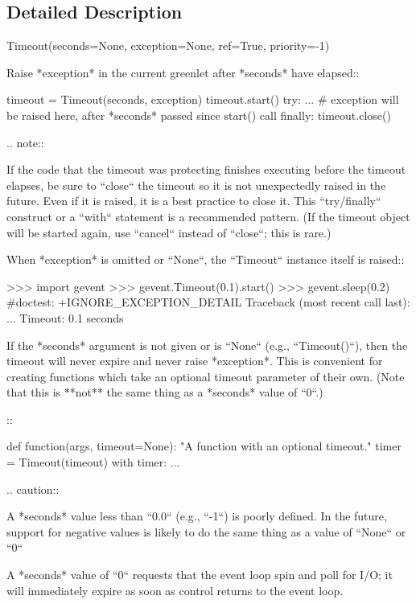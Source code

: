 \subsection{Detailed Description}
\begin{DoxyVerb}Timeout(seconds=None, exception=None, ref=True, priority=-1)

Raise *exception* in the current greenlet after *seconds*
have elapsed::

    timeout = Timeout(seconds, exception)
    timeout.start()
    try:
        ...  # exception will be raised here, after *seconds* passed since start() call
    finally:
        timeout.close()

.. note::

    If the code that the timeout was protecting finishes
    executing before the timeout elapses, be sure to ``close`` the
    timeout so it is not unexpectedly raised in the future. Even if it
    is raised, it is a best practice to close it. This ``try/finally``
    construct or a ``with`` statement is a recommended pattern. (If
    the timeout object will be started again, use ``cancel`` instead
    of ``close``; this is rare.)

When *exception* is omitted or ``None``, the ``Timeout`` instance
itself is raised::

    >>> import gevent
    >>> gevent.Timeout(0.1).start()
    >>> gevent.sleep(0.2)  #doctest: +IGNORE_EXCEPTION_DETAIL
    Traceback (most recent call last):
     ...
    Timeout: 0.1 seconds

If the *seconds* argument is not given or is ``None`` (e.g.,
``Timeout()``), then the timeout will never expire and never raise
*exception*. This is convenient for creating functions which take
an optional timeout parameter of their own. (Note that this is **not**
the same thing as a *seconds* value of ``0``.)

::

   def function(args, timeout=None):
      "A function with an optional timeout."
      timer = Timeout(timeout)
      with timer:
         ...

.. caution::

    A *seconds* value less than ``0.0`` (e.g., ``-1``) is poorly defined. In the future,
    support for negative values is likely to do the same thing as a value
    of ``None`` or ``0``

A *seconds* value of ``0`` requests that the event loop spin and poll for I/O;
it will immediately expire as soon as control returns to the event loop.


\end{DoxyVerb}
